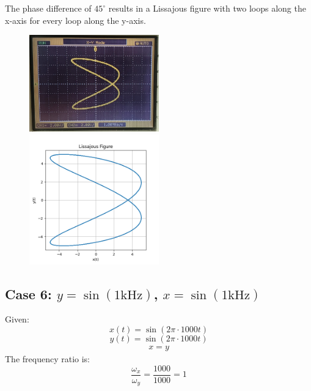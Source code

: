 \documentclass{article}
\begin{document}
The phase difference of \( 45^\circ \) results in a Lissajous figure with two loops along the x-axis for every loop along the y-axis.
\begin{figure}[H]
\centering
\includegraphics[width=0.5\textwidth]{figs/fig5.png}
\includegraphics[width=0.5\textwidth]{figs/fig5_verify.png}
\end{figure}
\subsection{Case 6: $y = \sin(1\text{kHz})$, $x = \sin(1\text{kHz})$}

Given:
\[
x(t) = \sin(2\pi \cdot 1000 t)
\]
\[
y(t) = \sin(2\pi \cdot 1000 t)
\]
\begin{align*}
x = y
\end{align*}
The frequency ratio is:
\[
\frac{\omega_x}{\omega_y} = \frac{1000}{1000} = 1
\]
\end{document}
